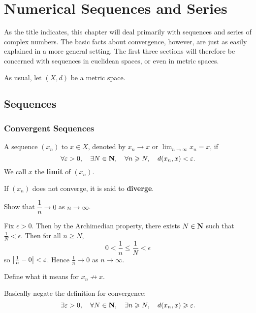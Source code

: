\chapter{Numerical Sequences and Series}\label{chap:num-seq-series}
As the title indicates, this chapter will deal primarily with sequences and series of complex numbers. The basic facts about convergence, however, are just as easily explained in a more general setting. The first three sections will therefore be concerned with sequences in euclidean spaces, or even in metric spaces.

As usual, let $(X,d)$ be a metric space.

\section{Sequences}
\subsection{Convergent Sequences}
\begin{definition}[Convergence]
A sequence $(x_n)$  to $x\in X$, denoted by $x_n\to x$ or $\displaystyle\lim_{n\to\infty}x_n=x$, if
\[\forall\varepsilon>0,\quad\exists N\in\mathbf N,\quad\forall n\geqslant N,\quad d(x_n,x)<\varepsilon.\]
We call $x$ the \textbf{limit} of $(x_n)$.

If $(x_n)$ does not converge, it is said to \textbf{diverge}.
\end{definition}

\begin{exercise}
Show that $\dfrac{1}{n}\to 0$ as $n\to\infty$.
\end{exercise}

\begin{solution}
Fix $\epsilon>0$. Then by the Archimedian property, there exists $N\in\mathbf N$ such that $\frac{1}{N}<\epsilon$. Then for all $n\ge N$,
\[0<\frac{1}{n}\le\frac{1}{N}<\epsilon\]
so $\left|\frac{1}{n}-0\right|<\varepsilon$. Hence $\frac{1}{n}\to0$ as $n\to\infty$.
\end{solution}

\begin{exercise}
Define what it means for $x_n\not\to x$.
\end{exercise}

\begin{solution}
Basically negate the definition for convergence:
\[\exists\varepsilon>0,\quad\forall N\in\mathbf N,\quad\exists n\geqslant N,\quad d(x_n,x)\geqslant\varepsilon.\]
\end{solution}

